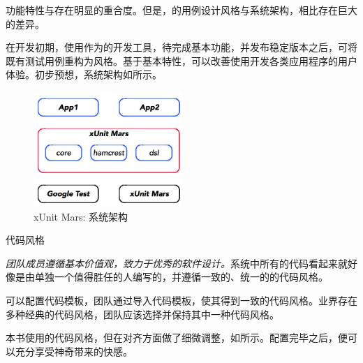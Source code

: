 \begin{content}

功能特性与存在明显的重合度。但是，的用例设计风格与系统架构，相比存在巨大的差异。

在开发初期，使用作为的开发工具，待完成基本功能，并发布稳定版本之后，可将既有测试用例重构为风格。基于基本特性，可以改善使用开发各类应用程序的用户体验。初步预想，系统架构如所示。

\begin{figure}[H]
\centering
\includegraphics[width=0.5\textwidth]{figures/xunit/framework.png}
\caption{xUnit Mars: 系统架构}
 \label{fig:mars-framework}
\end{figure}

\begin{episode}{代码风格}
\begin{content}

\emph{团队成员遵循基本价值观，致力于优秀的软件设计。}系统中所有的代码看起来就好像是由单独一个值得胜任的人编写的，并遵循一致的、统一的的代码风格。

可以配置代码模板，团队通过导入代码模板，使其得到一致的代码风格。业界存在多种经典的代码风格，团队应该选择并保持其中一种代码风格。

\begin{enum}
\end{enum}

本书使用的代码风格，但在对齐方面做了细微调整，如所示。配置完毕之后，便可以充分享受神奇带来的快感。


\end{content}
\end{episode}
\end{content}
